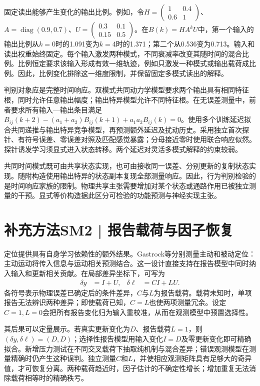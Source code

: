 \documentclass[11pt,a4paper]{article}
\begin{document}
固定读出能够产生变化的输出比例。例如，令$H=\left(\begin{smallmatrix}1&0.4\\0.6&1\end{smallmatrix}\right)$、$A=\operatorname{diag}(0.9,0.7)$、$U=\left(\begin{smallmatrix}0.3&0.1\\0.15&0.5\end{smallmatrix}\right)$。在$B(k)=HA^kU$中，第一个输入的输出比例从$k=0$时的1.091变为$k=4$时的1.371；第二个从0.536变为0.713。输入和读出权重始终固定。每个输入激发两种模式，不同衰减率改变其随时间的混合比例。比例恒定要求该输入形成有效一维轨迹，例如只激发一种模式或输出载荷成比例。因此，比例变化排除这一维度限制，并保留固定多模式读出的解释。

判别对象应是完整时间响应。双模式共同动力学模型要求两个输出具有相同特征根，同时允许任意输出幅度；输出特异模型允许不同特征根。在无误差测量中，前者要求所有输入—输出条目满足$B_{ij}(k+2)-(a_1+a_2)B_{ij}(k+1)+a_1a_2B_{ij}(k)=0$。使用多个训练延迟拟合共同递推与输出特异竞争模型，再预测额外延迟及扰动历史。采用独立首次探针、有符号误差、零误差对照及匹配感觉暴露；分母接近零时使用联合响应似然。探针诱发学习须显式进入状态转移。两个延迟对灵活多模式解释的约束较弱。\cite{unlearning2016}

共同时间模式既可由共享状态实现，也可由接收同一误差、分别更新的复制状态实现。随附构造使用输出特异的状态副本复现全部测量响应。因此，行为判别检验的是时间响应家族的限制。物理共享主张需要增加对某个状态或通路作用已被独立测量的干预。显式等价构造据此区分可检验的功能预测与神经实现主张。

\clearpage\section{补充方法SM2 | 报告载荷与因子恢复}

定位提供具有自身学习依赖性的额外结果。Gastrock等分别测量主动和被动定位：主动运动将传入信息与运动相关预测结合。这一设计直接支持在报告模型中同时纳入输入和更新相关贡献。在局部差异坐标下，可写为
\begin{align}\delta y&=I+U, &\delta\ell&=C I+L U.\label{eq:calibration}\end{align}
各符号表示物理误差已确定后的条件差异，$C$与$L$为报告载荷。载荷未知时，单项报告无法辨识两种差异；即使载荷已知，$C=L$也使两项测量冗余。设定$C=1,L=0$会把所有报告变化归为输入重校准，从而在观测模型中预置选择性。\cite{external2020,hayashi2020}

其后果可以定量展示。若真实更新变化为$D$、报告载荷$L=1$，则$(\delta y,\delta\ell)=(D,D)$；选择性报告模型用输入变化$I=D$及零更新变化即可精确拟合。新增压力测试在不同交叉载荷下抽取纯机制与混合差异；错误观测模型在测量精确时仍产生这种误判。独立测量$C$和$L$，并使相应观测矩阵具有足够大的奇异值，才可恢复分离。两种载荷趋近时，因子估计的不确定性增长；增加重复无法消除载荷相等时的精确秩亏。
\end{document}
